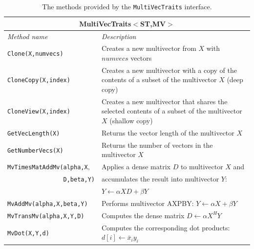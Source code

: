 \documentclass[acmtoms,acmnow]{acmtrans2m}
\newcommand{\aspace}[1]{\texttt{#1}}
\begin{document}
\begin{table}
\begin{center}
  \caption{The methods provided by the \aspace{MultiVecTraits} interface.}
\label{tab:anasazi:mvt}
\begin{tabular}{| p{4cm} | p{8cm} |}
\hline
\multicolumn{2}{|c|}{\textbf{MultiVecTraits$<$ST,MV$>$}} \\\hline
\emph{Method name} & \emph{Description} \\\hline
{\tt Clone(X,numvecs)}           & Creates a new multivector from $X$ with
$numvecs$ vectors  \\

{\tt CloneCopy(X,index)} & Creates a new multivector with a copy of the contents of
a subset of the multivector $X$ (deep copy) \\

{\tt CloneView(X,index)} & Creates a new multivector that shares the selected
contents of a subset of the multivector $X$ (shallow copy)  \\\hline

{\tt GetVecLength(X)} & Returns the vector length of the multivector $X$
\\

{\tt GetNumberVecs(X)}& Returns the number of vectors in the multivector $X$
\\\hline

{\tt MvTimesMatAddMv(alpha,X}, & Applies a dense matrix $D$ to multivector $X$ and \\ 
{\tt \ \ \ \ \ \ \ \ \ \ \ \ \ \ \ \ D,beta,Y)} & accumulates the result into multivector $Y$:\\ & $Y \leftarrow \alpha X D + \beta Y$  \\

{\tt MvAddMv(alpha,X,beta,Y)}  & Performs multivector AXPBY: $Y \leftarrow \alpha X + \beta Y$
\\

{\tt MvTransMv(alpha,X,Y,D)} & Computes the dense matrix $D \leftarrow \alpha X^H Y$
\\

{\tt MvDot(X,Y,d)} & Computes the corresponding dot products:
$d[i] \leftarrow \bar{x}_i y_i$  \\


\end{tabular}
\end{center}
\end{table}
\end{document}
